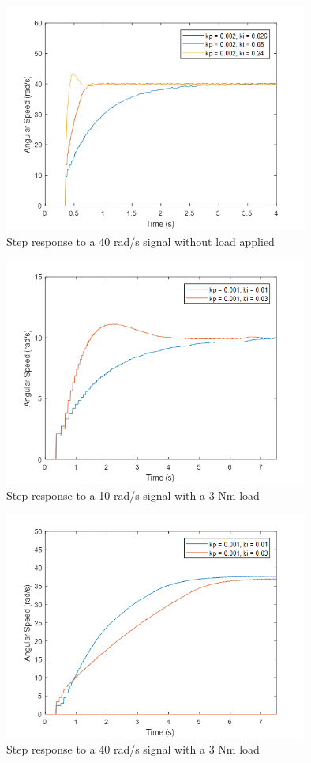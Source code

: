 \begin{figure}[h!p]
\centering
\includegraphics[width=10cm]{Images/plots/plot_3.png} 
\caption[Step response to a 40 rad/s signal without load applied]{Step response to a 40 rad/s signal without load applied}
\label{fig:plot3}
\end{figure}

\begin{figure}[h!p]
\centering
\includegraphics[width=10cm]{Images/plots/plot_4.png} 
\caption[Step response to a 10 rad/s signal with a 3 Nm load]{Step response to a 10 rad/s signal with a 3 Nm load}
\label{fig:plot4}
\end{figure}

\begin{figure}[h!p]
\centering
\includegraphics[width=10cm]{Images/plots/plot_5.png} 
\caption[Step response to a 40 rad/s signal with a 3 Nm load]{Step response to a 40 rad/s signal with a 3 Nm load}
\label{fig:plot5}
\end{figure}

